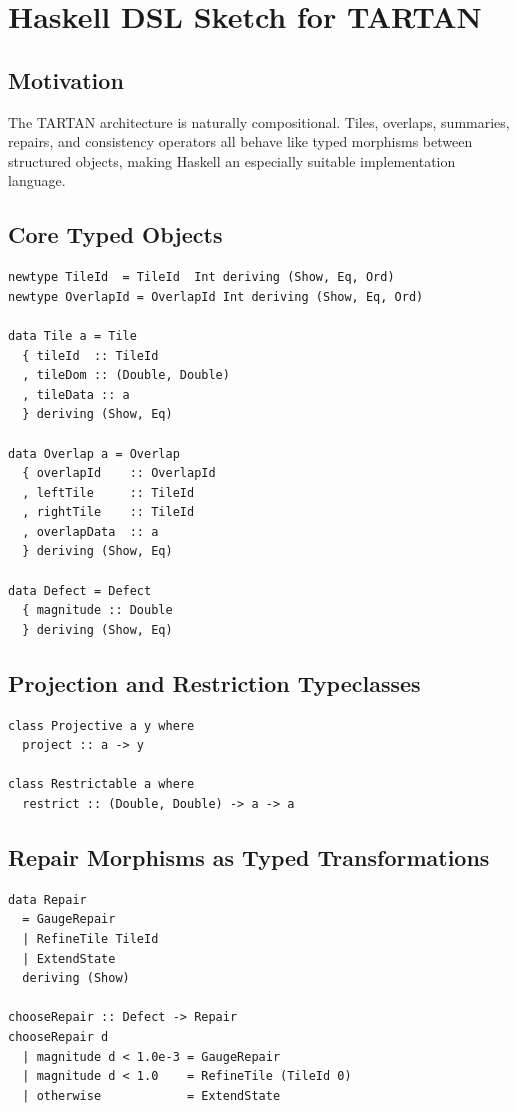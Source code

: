 \documentclass[12pt, oneside]{article}
\begin{document}
\section{Haskell DSL Sketch for TARTAN}

\subsection{Motivation}

The TARTAN architecture is naturally compositional. Tiles, overlaps, summaries, repairs, and consistency operators all behave like typed morphisms between structured objects, making Haskell an especially suitable implementation language.

\subsection{Core Typed Objects}

\begin{lstlisting}
newtype TileId  = TileId  Int deriving (Show, Eq, Ord)
newtype OverlapId = OverlapId Int deriving (Show, Eq, Ord)

data Tile a = Tile
  { tileId  :: TileId
  , tileDom :: (Double, Double)
  , tileData :: a
  } deriving (Show, Eq)

data Overlap a = Overlap
  { overlapId    :: OverlapId
  , leftTile     :: TileId
  , rightTile    :: TileId
  , overlapData  :: a
  } deriving (Show, Eq)

data Defect = Defect
  { magnitude :: Double
  } deriving (Show, Eq)
\end{lstlisting}

\subsection{Projection and Restriction Typeclasses}

\begin{lstlisting}
class Projective a y where
  project :: a -> y

class Restrictable a where
  restrict :: (Double, Double) -> a -> a
\end{lstlisting}

\subsection{Repair Morphisms as Typed Transformations}

\begin{lstlisting}
data Repair
  = GaugeRepair
  | RefineTile TileId
  | ExtendState
  deriving (Show)

chooseRepair :: Defect -> Repair
chooseRepair d
  | magnitude d < 1.0e-3 = GaugeRepair
  | magnitude d < 1.0    = RefineTile (TileId 0)
  | otherwise            = ExtendState
\end{lstlisting}
\end{document}
